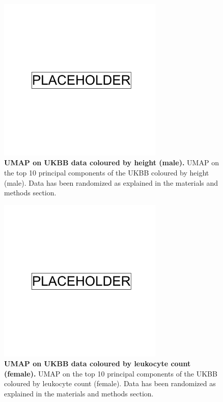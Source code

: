 \newpage

\begin{figure}[ht]
    \centering
    \includegraphics[width=0.7\textwidth]{placeholder.png}
    \caption[UMAP on UKBB data coloured by height (male)]{\textbf{UMAP on UKBB data coloured by height (male).} UMAP on the top 10 principal components of the UKBB coloured by height (male). Data has been randomized as explained in the materials and methods section.}
    \label{fig:supp_ukbb_height_m}
\end{figure}

\newpage

\begin{figure}[ht]
    \centering
    \includegraphics[width=0.7\textwidth]{placeholder.png}
    \caption[UMAP on UKBB data coloured by leukocyte count (female)]{\textbf{UMAP on UKBB data coloured by leukocyte count (female).} UMAP on the top 10 principal components of the UKBB coloured by leukocyte count (female). Data has been randomized as explained in the materials and methods section.}
    \label{fig:supp_ukbb_leukocyte_f}
\end{figure}

